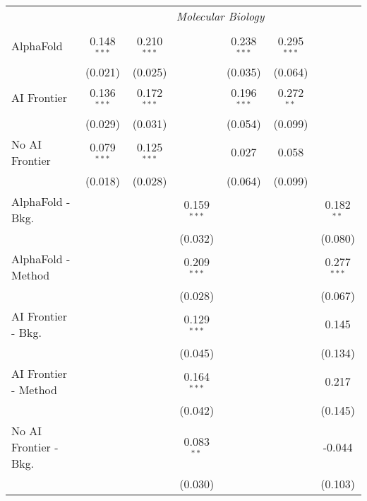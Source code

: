 \begin{tabular}{lcccccc}
 & \multicolumn{6}{c}{\textit{Molecular Biology}} \\ \\
   AlphaFold               & 0.148$^{***}$ & 0.210$^{***}$ &               & 0.238$^{***}$ & 0.295$^{***}$ &   \\   
                           & (0.021)       & (0.025)       &               & (0.035)       & (0.064)       &   \\   
   AI Frontier             & 0.136$^{***}$ & 0.172$^{***}$ &               & 0.196$^{***}$ & 0.272$^{**}$  &   \\   
                           & (0.029)       & (0.031)       &               & (0.054)       & (0.099)       &   \\   
   No AI Frontier          & 0.079$^{***}$ & 0.125$^{***}$ &               & 0.027         & 0.058         &   \\   
                           & (0.018)       & (0.028)       &               & (0.064)       & (0.099)       &   \\   
   AlphaFold - Bkg.        &               &               & 0.159$^{***}$ &               &               & 0.182$^{**}$\\   
                           &               &               & (0.032)       &               &               & (0.080)\\   
   AlphaFold - Method      &               &               & 0.209$^{***}$ &               &               & 0.277$^{***}$\\   
                           &               &               & (0.028)       &               &               & (0.067)\\   
   AI Frontier - Bkg.      &               &               & 0.129$^{***}$ &               &               & 0.145\\   
                           &               &               & (0.045)       &               &               & (0.134)\\   
   AI Frontier - Method    &               &               & 0.164$^{***}$ &               &               & 0.217\\   
                           &               &               & (0.042)       &               &               & (0.145)\\   
   No AI Frontier - Bkg.   &               &               & 0.083$^{**}$  &               &               & -0.044\\   
                           &               &               & (0.030)       &               &               & (0.103)\\   

\end{tabular}
